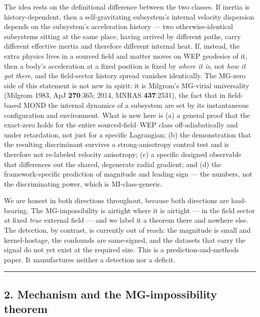 \documentclass[
]{article}
\begin{document}
The idea rests on the definitional difference between the two classes.
If inertia is history-dependent, then a self-gravitating subsystem's
internal velocity dispersion depends on the subsystem's acceleration
history --- two otherwise-identical subsystems sitting at the same
place, having arrived by different paths, carry different effective
inertia and therefore different internal heat. If, instead, the extra
physics lives in a sourced field and matter moves on WEP geodesics of
it, then a body's acceleration at a fixed position is fixed by
\emph{where it is}, not \emph{how it got there}, and the field-sector
history spread vanishes identically. The MG-zero side of this statement
is not new in spirit: it is Milgrom's MG-virial universality (Milgrom
1983, ApJ \textbf{270}:365; 2014, MNRAS \textbf{437}:2531), the fact
that in field-based MOND the internal dynamics of a subsystem are set by
its instantaneous configuration and environment. What is new here is (a)
a general proof that the exact-zero holds for the entire
sourced-field--WEP class off-adiabatically and under retardation, not
just for a specific Lagrangian; (b) the demonstration that the resulting
discriminant survives a strong-anisotropy control test and is therefore
not re-labeled velocity anisotropy; (c) a specific designed observable
that differences out the shared, degenerate radial gradient; and (d) the
framework-specific prediction of magnitude and leading sign --- the
numbers, not the discriminating power, which is MI-class-generic.

We are honest in both directions throughout, because both directions are
load-bearing. The MG-impossibility is airtight where it is airtight ---
in the field sector at fixed \emph{true} external field --- and we label
it a theorem there and nowhere else. The detection, by contrast, is
currently out of reach: the magnitude is small and kernel-hostage, the
confounds are same-signed, and the datasets that carry the signal do not
yet exist at the required size. This is a prediction-and-methods paper.
It manufactures neither a detection nor a deficit.

\begin{center}\rule{0.5\linewidth}{0.5pt}\end{center}

\subsection{2. Mechanism and the MG-impossibility
theorem}\label{mechanism-and-the-mg-impossibility-theorem}
\end{document}
